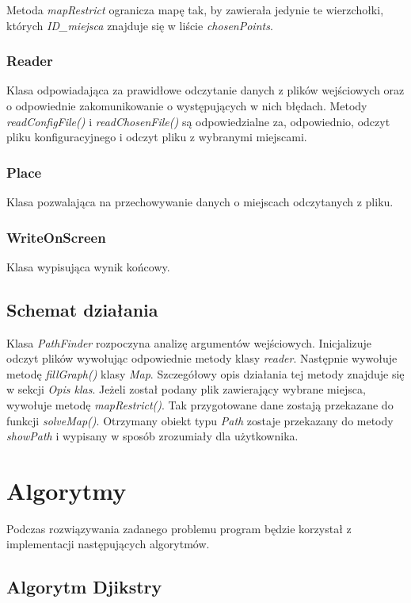 \documentclass{article}
\begin{document}
Metoda \textit{mapRestrict} ogranicza mapę tak, by zawierała jedynie te wierzchołki, których \textit{ID\_miejsca} znajduje się w liście \textit{chosenPoints}.

\subsubsection{Reader}
Klasa odpowiadająca za prawidłowe odczytanie danych z plików wejściowych oraz o odpowiednie zakomunikowanie o występujących w nich błędach. Metody \textit{readConfigFile()} i \textit{readChosenFile()} są odpowiedzialne za, odpowiednio, odczyt pliku konfiguracyjnego i odczyt pliku z wybranymi miejscami.

\subsubsection{Place}
Klasa pozwalająca na przechowywanie danych o miejscach odczytanych z pliku.

\subsubsection{WriteOnScreen}
Klasa wypisująca wynik końcowy.

\subsection{Schemat działania}
Klasa \textit{PathFinder} rozpoczyna analizę argumentów wejściowych. Inicjalizuje odczyt plików wywołując odpowiednie metody klasy \textit{reader}. Następnie wywołuje metodę \textit{fillGraph()} klasy \textit{Map}. Szczegółowy opis działania tej metody znajduje się w sekcji \textit{Opis klas}. Jeżeli został podany plik zawierający wybrane miejsca, wywołuje metodę \textit{mapRestrict()}. Tak przygotowane dane zostają przekazane do funkcji \textit{solveMap()}. Otrzymany obiekt typu \textit{Path} zostaje przekazany do metody \textit{showPath} i wypisany w sposób zrozumiały dla użytkownika.

\section{Algorytmy}
Podczas rozwiązywania zadanego problemu program będzie korzystał z implementacji następujących algorytmów.

\subsection{Algorytm Djikstry}
\end{document}
